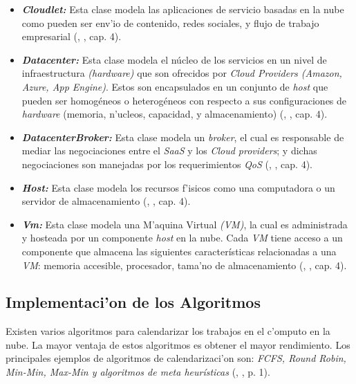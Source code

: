\begin{itemize}
	\item \textit{\textbf{Cloudlet:}} Esta clase modela las aplicaciones de servicio basadas en la nube como pueden ser env'io de contenido, redes sociales, y flujo de trabajo empresarial (\citeauthor{calheiros2011cloudsim}, \citeyear{calheiros2011cloudsim}, cap. 4).
	\item \textit{ \textbf{Datacenter:}} Esta clase modela el núcleo de los servicios en un nivel de infraestructura \textit{(hardware)} que son ofrecidos por \textit{Cloud Providers (Amazon, Azure, App Engine)}. Estos son encapsulados en un conjunto de \textit{host} que pueden ser homogéneos o heterogéneos con respecto a sus configuraciones de \textit{hardware} (memoria, n'ucleos, capacidad, y almacenamiento) (\citeauthor{calheiros2011cloudsim}, \citeyear{calheiros2011cloudsim}, cap. 4).
	\item \textit{ \textbf{DatacenterBroker:}} Esta clase modela un \textit{broker}, el cual es responsable de mediar las negociaciones entre el \textit{SaaS} y los \textit{Cloud providers}; y dichas negociaciones son manejadas por los requerimientos \textit{QoS} (\citeauthor{calheiros2011cloudsim}, \citeyear{calheiros2011cloudsim}, cap. 4).
	\item  \textit{\textbf{Host:}} Esta clase modela los recursos f'isicos como una computadora o un servidor de almacenamiento (\citeauthor{calheiros2011cloudsim}, \citeyear{calheiros2011cloudsim}, cap. 4).
	\item  \textit{\textbf{Vm:}} Esta clase modela una M'aquina Virtual \textit{(VM)}, la cual es administrada y hosteada por un componente \textit{host} en la nube. Cada \textit{VM} tiene acceso a un componente que almacena las siguientes características relacionadas a una \textit{VM}: memoria accesible, procesador, tama'no de almacenamiento (\citeauthor{calheiros2011cloudsim}, \citeyear{calheiros2011cloudsim}, cap. 4).
\end{itemize}


\newpage

\subsection{Implementaci'on de los Algoritmos}

Existen varios algoritmos para calendarizar los trabajos en el c'omputo en la nube. La mayor ventaja de estos algoritmos es obtener el mayor rendimiento. Los principales ejemplos de algoritmos de calendarizaci'on son: \textit{FCFS, Round Robin, Min-Min, Max-Min y algoritmos de meta heurísticas}  (\citeauthor{shimpy2014different}, \citeyear{shimpy2014different}, p. 1).



